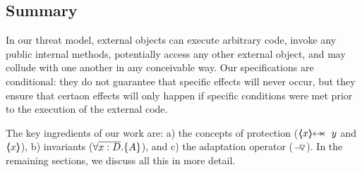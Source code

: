 \subsection*{Summary}

In our threat model, external objects can execute arbitrary code, invoke any public internal methods,  potentially access any other external object, and may collude with one another in any conceivable way.
Our specifications are conditional: they do not guarantee that specific effects will never occur, but they ensure that certaon effects will only happen if specific conditions were met prior to the execution of the external code.
 
The key ingredients of our work are: a) the concepts of protection ($\protectedFrom {x} {y}$ and $\langle\!\!\langle x \rangle\!\!\rangle$), b) \scoped invariants (${\forall {\overline {x:D}}.{{\{}}{A}{{\}}}}$), and c) the adaptation operator ($ { } \!-\!\!\!\,\!{\triangledown} { } $).
In the remaining sections, we discuss all this in more detail.

 

 

 
 
